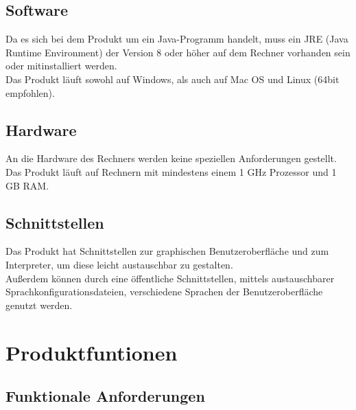 \documentclass[parskip=full]{scrartcl}
\begin{document}
\subsection{Software}
Da es sich bei dem Produkt um ein Java-Programm handelt, muss ein JRE (Java Runtime Environment) der Version 8 oder höher auf dem Rechner vorhanden sein oder mitinstalliert werden. \\
Das Produkt läuft sowohl auf Windows, als auch auf Mac OS und Linux (64bit empfohlen).

\subsection{Hardware}
An die Hardware des Rechners werden keine speziellen Anforderungen gestellt. Das Produkt läuft auf Rechnern mit mindestens einem 1 GHz Prozessor und 1 GB RAM.

\subsection{Schnittstellen}
Das Produkt hat Schnittstellen zur graphischen Benutzeroberfläche und zum Interpreter, um diese leicht austauschbar zu gestalten. \\
Außerdem können durch eine öffentliche Schnittstellen, mittels austauschbarer Sprachkonfigurationsdateien, verschiedene Sprachen der Benutzeroberfläche genutzt werden. 

\newpage

\section{Produktfuntionen}
	 	\subsection{Funktionale Anforderungen}
\end{document}
